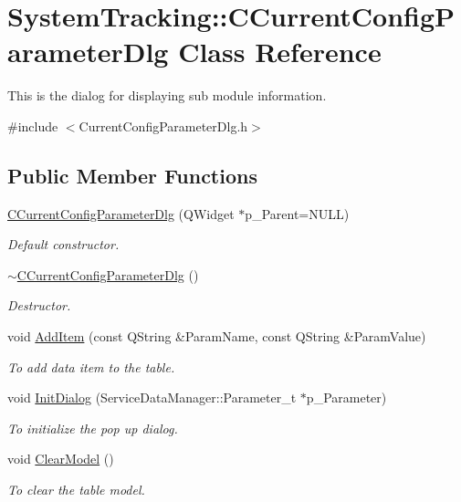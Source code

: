 \hypertarget{classSystemTracking_1_1CCurrentConfigParameterDlg}{\section{\-System\-Tracking\-:\-:\-C\-Current\-Config\-Parameter\-Dlg \-Class \-Reference}
\label{classSystemTracking_1_1CCurrentConfigParameterDlg}
}


\-This is the dialog for displaying sub module information.  




{\ttfamily \#include $<$\-Current\-Config\-Parameter\-Dlg.\-h$>$}

\subsection*{\-Public \-Member \-Functions}
\begin{DoxyCompactItemize}
\item 
\hyperlink{classSystemTracking_1_1CCurrentConfigParameterDlg_afd72352cafdf2e1133f9325ca2ede04e}{\-C\-Current\-Config\-Parameter\-Dlg} (\-Q\-Widget $\ast$p\-\_\-\-Parent=\-N\-U\-L\-L)
\begin{DoxyCompactList}\small\item\em \-Default constructor. \end{DoxyCompactList}\item 
\hyperlink{classSystemTracking_1_1CCurrentConfigParameterDlg_a70e0fae56f9bae3c144955406de8e063}{$\sim$\-C\-Current\-Config\-Parameter\-Dlg} ()
\begin{DoxyCompactList}\small\item\em \-Destructor. \end{DoxyCompactList}\item 
void \hyperlink{classSystemTracking_1_1CCurrentConfigParameterDlg_a0cef26e75dbc092ac2dde8d0c8f3224d}{\-Add\-Item} (const \-Q\-String \&\-Param\-Name, const \-Q\-String \&\-Param\-Value)
\begin{DoxyCompactList}\small\item\em \-To add data item to the table. \end{DoxyCompactList}\item 
void \hyperlink{classSystemTracking_1_1CCurrentConfigParameterDlg_af5d0ab456f05c0c88f07541804e2f947}{\-Init\-Dialog} (\-Service\-Data\-Manager\-::\-Parameter\-\_\-t $\ast$p\-\_\-\-Parameter)
\begin{DoxyCompactList}\small\item\em \-To initialize the pop up dialog. \end{DoxyCompactList}\item 
void \hyperlink{classSystemTracking_1_1CCurrentConfigParameterDlg_a0d07fbe0604957bf21d4f00e56367be7}{\-Clear\-Model} ()
\begin{DoxyCompactList}\small\item\em \-To clear the table model. \end{DoxyCompactList}\end{DoxyCompactItemize}
